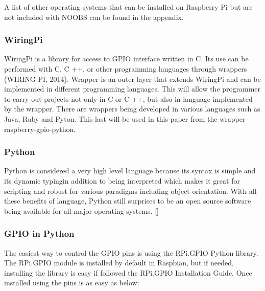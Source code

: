 \documentclass{acm_proc_article-sp}
\begin{document}
A list of other operating systems that can be installed on Raspberry Pi but are not included with NOOBS can be found in the appendix.

\subsubsection{WiringPi}
WiringPi is a library for access to GPIO interface written in C. Its use can be performed with C, C ++, or other programming languages through wrappers (WIRING PI, 2014). Wrapper is an outer layer that extends WiringPi and can be implemented in different programming languages. This will allow the programmer to carry out projects not only in C or C ++, but also in language implemented by the wrapper. There are wrappers being developed in various languages such as Java, Ruby and Pyton. This last will be used in this paper from the wrapper raspberry-gpio-python.

\subsubsection{Python}
Python is considered a very high level language because its syntax is simple and its dynamic typingin addition to being interpreted which makes it great for scripting and robust for various paradigms including object orientation. With all these benefits of language, Python still surprises to be an open source software being available for all major operating systems.
[] %


\subsubsection{GPIO in Python}
The easiest way to control the GPIO pins is using the RPi.GPIO Python library. The RPi.GPIO module is installed by default in Raspbian, but if needed, installing the library is easy if followed the RPi.GPIO Installation Guide. Once installed using the pins is as easy as below: 
\end{document}
